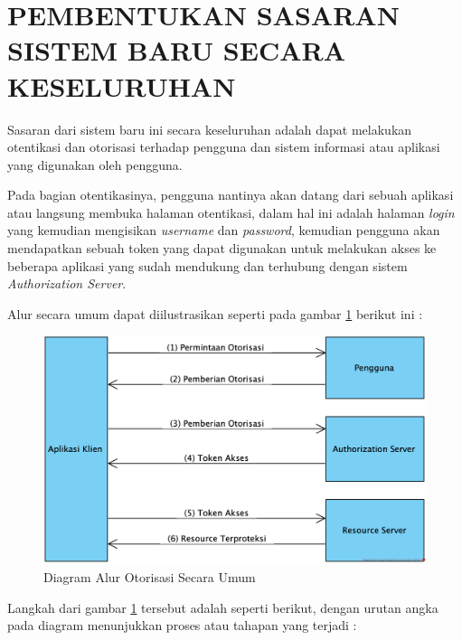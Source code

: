 \documentclass[pdftex,12pt, oneside]{article}
\begin{document}
\section{PEMBENTUKAN SASARAN SISTEM BARU SECARA KESELURUHAN}

Sasaran dari sistem baru ini secara keseluruhan adalah dapat melakukan otentikasi dan otorisasi terhadap pengguna dan sistem informasi atau aplikasi yang digunakan oleh pengguna.

Pada bagian otentikasinya, pengguna nantinya akan datang dari sebuah aplikasi atau langsung membuka halaman otentikasi, dalam hal ini adalah halaman \textit{login} yang kemudian mengisikan \textit{username} dan \textit{password}, kemudian pengguna akan mendapatkan sebuah token yang dapat digunakan untuk melakukan akses ke beberapa aplikasi yang sudah mendukung dan terhubung dengan sistem \textit{Authorization Server}.

Alur secara umum dapat diilustrasikan seperti pada gambar \ref{fig:flow-oauth} berikut ini :

\begin{figure}[H]
	\centering
	\includegraphics[width=1\textwidth]{./resources/flow-oauth-protocol}
	\caption{Diagram Alur Otorisasi Secara Umum}
	\label{fig:flow-oauth}
\end{figure}

Langkah dari gambar \ref{fig:flow-oauth} tersebut adalah seperti berikut, dengan urutan angka pada diagram menunjukkan proses atau tahapan yang terjadi :
\end{document}
